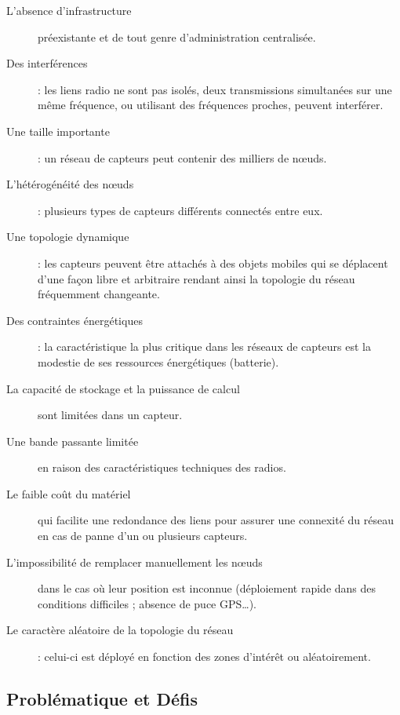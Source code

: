 \begin{description}
\item[L'absence d’infrastructure] préexistante et de tout genre d’administration centralisée.

\item[Des interférences] : les liens radio ne sont pas isolés, deux transmissions simultanées sur une même fréquence, ou utilisant des fréquences proches, peuvent interférer.

\item[Une taille importante] : un réseau de capteurs peut contenir des milliers de nœuds.

\item[L'hétérogénéité des nœuds] : plusieurs types de capteurs différents connectés entre eux.

\item[Une topologie dynamique] : les capteurs peuvent être attachés à des objets mobiles qui se déplacent d’une façon libre et arbitraire rendant ainsi la topologie du réseau fréquemment changeante.

\item[Des contraintes énergétiques] : la caractéristique la plus critique dans les réseaux de capteurs est la modestie de ses ressources énergétiques (batterie).

\item[La capacité de stockage et la puissance de calcul] sont limitées dans un capteur.

\item[Une bande passante limitée] en raison des caractéristiques techniques des radios.

\item[Le faible coût du matériel] qui facilite une redondance des liens pour assurer une connexité du réseau en cas de panne d’un ou plusieurs capteurs.

\item[L’impossibilité de remplacer manuellement les nœuds] dans le cas où leur position est inconnue (déploiement rapide dans des conditions difficiles ; absence de puce GPS…).

\item[Le caractère aléatoire de la topologie du réseau] : celui-ci est déployé en fonction des zones d'intérêt ou aléatoirement.
\end{description}



\subsection{Problématique et Défis}

